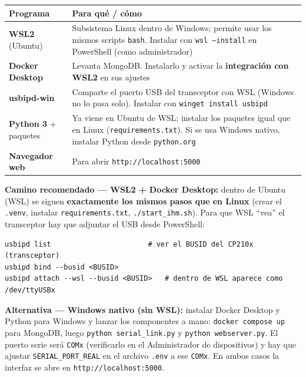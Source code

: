 \documentclass[12pt,a4paper]{article}
\newcommand{\file}[1]{\texttt{#1}}
\begin{document}
\begin{longtable}{L{4.2cm} L{8.8cm}}
  \toprule
  \textcolor{tableheadfg}{\textbf{Programa}} &
  \textcolor{tableheadfg}{\textbf{Para qu\'e / c\'omo}} \\
  \midrule
  \endhead
  \bottomrule
  \endfoot
  \textbf{WSL2} (Ubuntu) & Subsistema Linux dentro de Windows; permite usar los
    mismos scripts \texttt{bash}. Instalar con \texttt{wsl --install} en PowerShell
    (como administrador) \\[3pt]
  \textbf{Docker Desktop} & Levanta MongoDB. Instalarlo y activar la
    \textbf{integraci\'on con WSL2} en sus ajustes \\[3pt]
  \textbf{usbipd-win} & Comparte el puerto USB del transceptor con WSL (Windows no lo
    pasa solo). Instalar con \texttt{winget install usbipd} \\[3pt]
  \textbf{Python 3} + paquetes & Ya viene en Ubuntu de WSL; instalar los paquetes
    igual que en Linux (\file{requirements.txt}). Si se usa Windows nativo, instalar
    Python desde \texttt{python.org} \\[3pt]
  \textbf{Navegador web} & Para abrir \texttt{http://localhost:5000} \\
\end{longtable}

\textbf{Camino recomendado --- WSL2 + Docker Desktop:} dentro de Ubuntu (WSL) se
siguen \textbf{exactamente los mismos pasos que en Linux} (crear el \texttt{.venv},
instalar \file{requirements.txt}, \file{./start\_ihm.sh}). Para que WSL ``vea'' el
transceptor hay que adjuntar el USB desde PowerShell:

\begin{lstlisting}[style=shell, caption={Adjuntar el USB del transceptor a WSL (PowerShell admin)}]
usbipd list                       # ver el BUSID del CP210x (transceptor)
usbipd bind --busid <BUSID>
usbipd attach --wsl --busid <BUSID>   # dentro de WSL aparece como /dev/ttyUSBx
\end{lstlisting}

\textbf{Alternativa --- Windows nativo (sin WSL):} instalar Docker Desktop y Python
para Windows y lanzar los componentes a mano: \texttt{docker compose up} para
MongoDB, luego \texttt{python serial\_link.py} y \texttt{python webserver.py}. El
puerto serie ser\'a \texttt{COMx} (verificarlo en el Administrador de dispositivos)
y hay que ajustar \texttt{SERIAL\_PORT\_REAL} en el archivo \file{.env} a ese
\texttt{COMx}. En ambos casos la interfaz se abre en \texttt{http://localhost:5000}.
\end{document}
